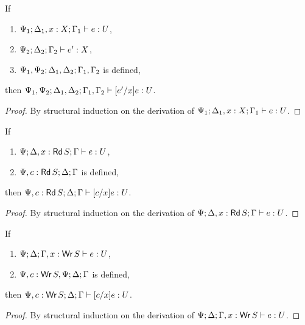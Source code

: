 \begin{lemma}\label{lem:sub-aff}
  If
  \begin{enumerate}
  \item $\Psi_1; \Delta_1, x : X; \Gamma_1 |- e : U$,
  \item $\Psi_2; \Delta_2; \Gamma_2 |- e' : X$,
  \item $\Psi_1,\Psi_2 ; \Delta_1,\Delta_2 ; \Gamma_1,\Gamma_2$ is defined,
  \end{enumerate}
  then $\Psi_1,\Psi_2; \Delta_1,\Delta_2; \Gamma_1,\Gamma_2 |- [e'/x]e : U$.
  \begin{proof}
    By structural induction on the derivation of $\Psi_1; \Delta_1, x : X; \Gamma_1 |- e : U$.
  \end{proof}
\end{lemma}

\begin{lemma}\label{lem:sub-rd}
  If
  \begin{enumerate}
  \item $\Psi; \Delta, x : \textnormal{\textsf{Rd}}\,S; \Gamma |- e : U$,
  \item $\Psi,c:\textnormal{\textsf{Rd}}\,S; \Delta ; \Gamma$ is defined,
  \end{enumerate}
  then $\Psi,c:\textnormal{\textsf{Rd}}\,S; \Delta; \Gamma |- [c/x]e : U$.
  \begin{proof}
    By structural induction on the derivation of $\Psi; \Delta, x : \textnormal{\textsf{Rd}}\,S; \Gamma |- e : U$.
  \end{proof}
\end{lemma}

\begin{lemma}\label{lem:sub-wr}
  If
  \begin{enumerate}
  \item $\Psi; \Delta; \Gamma, x : \textnormal{\textsf{Wr}}\,S |- e : U$,
  \item $\Psi,c:\textnormal{\textsf{Wr}}\,S,\Psi ; \Delta ; \Gamma$ is defined,
  \end{enumerate}
  then $\Psi,c:\textnormal{\textsf{Wr}}\,S; \Delta; \Gamma |- [c/x]e : U$.
  \begin{proof}
    By structural induction on the derivation of $\Psi; \Delta; \Gamma, x : \textnormal{\textsf{Wr}}\,S |- e : U$.
  \end{proof}
\end{lemma}

